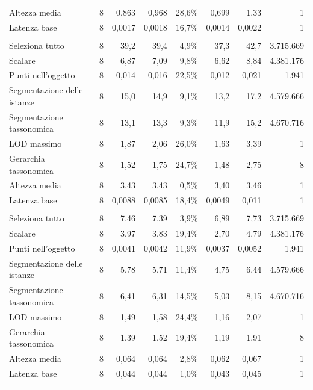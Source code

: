 \begin{small}
\begin{longtable}{lrrrrrr r}
\quad Altezza media & 8 & 0,863 & 0,968 & 28,6\% & 0,699 & 1,33 & 1 \\
\quad Latenza base & 8 & 0,0017 & 0,0018 & 16,7\% & 0,0014 & 0,0022 & 1 \\
\addlinespace
\multicolumn{8}{l}{\textbf{qEndpoint}}\\
\quad Seleziona tutto & 8 & 39,2 & 39,4 & 4,9\% & 37,3 & 42,7 & 3.715.669 \\
\quad Scalare & 8 & 6,87 & 7,09 & 9,8\% & 6,62 & 8,84 & 4.381.176 \\
\quad Punti nell'oggetto & 8 & 0,014 & 0,016 & 22,5\% & 0,012 & 0,021 & 1.941 \\
\quad Segmentazione delle istanze & 8 & 15,0 & 14,9 & 9,1\% & 13,2 & 17,2 & 4.579.666 \\
\quad Segmentazione tassonomica & 8 & 13,1 & 13,3 & 9,3\% & 11,9 & 15,2 & 4.670.716 \\
\quad LOD massimo & 8 & 1,87 & 2,06 & 26,0\% & 1,63 & 3,39 & 1 \\
\quad Gerarchia tassonomica & 8 & 1,52 & 1,75 & 24,7\% & 1,48 & 2,75 & 8 \\
\quad Altezza media & 8 & 3,43 & 3,43 & 0,5\% & 3,40 & 3,46 & 1 \\
\quad Latenza base & 8 & 0,0088 & 0,0085 & 18,4\% & 0,0049 & 0,011 & 1 \\
\addlinespace
\multicolumn{8}{l}{\textbf{QLever}}\\
\quad Seleziona tutto & 8 & 7,46 & 7,39 & 3,9\% & 6,89 & 7,73 & 3.715.669 \\
\quad Scalare & 8 & 3,97 & 3,83 & 19,4\% & 2,70 & 4,79 & 4.381.176 \\
\quad Punti nell'oggetto & 8 & 0,0041 & 0,0042 & 11,9\% & 0,0037 & 0,0052 & 1.941 \\
\quad Segmentazione delle istanze & 8 & 5,78 & 5,71 & 11,4\% & 4,75 & 6,44 & 4.579.666 \\
\quad Segmentazione tassonomica & 8 & 6,41 & 6,31 & 14,5\% & 5,03 & 8,15 & 4.670.716 \\
\quad LOD massimo & 8 & 1,49 & 1,58 & 24,4\% & 1,16 & 2,07 & 1 \\
\quad Gerarchia tassonomica & 8 & 1,39 & 1,52 & 19,4\% & 1,19 & 1,91 & 8 \\
\quad Altezza media & 8 & 0,064 & 0,064 & 2,8\% & 0,062 & 0,067 & 1 \\
\quad Latenza base & 8 & 0,044 & 0,044 & 1,0\% & 0,043 & 0,045 & 1 \\
\addlinespace
\multicolumn{8}{l}{\textbf{RDFLib}}\\

\end{longtable}
\end{small}
